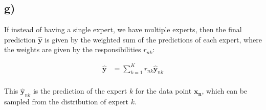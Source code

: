 \documentclass[12pt,a4paper,oneside]{paper}
\begin{document}
\newpage
\subsection*{g)}

If instead of having a single expert, we have multiple experts, then the final prediction $\bm{\hat{y}}$ is given by
the weighted sum of the predictions of each expert, where the weights are given by the responsibilities $r_{nk}$:

\begin{align*}
    \bm{\hat{y}} &= \sum_{k=1}^{K} r_{nk} \bm{\hat{y}}_{nk} \\
\end{align*}

This $\bm{\hat{y}}_{nk}$ is the prediction of the expert $k$ for the data point $\bm{x_n}$, which can be
sampled from the distribution of expert $k$.



\clearpage

\appendix


\newpage
\printbibliography
\end{document}
